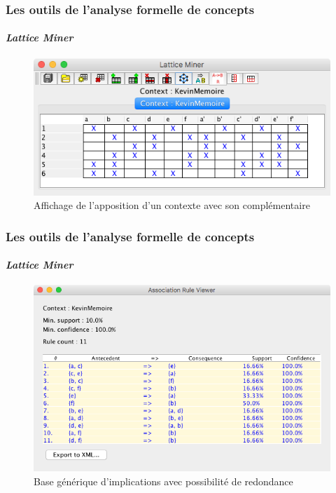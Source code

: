 \documentclass[french]{beamer}
\newcommand{\lm}{\emph{Lattice Miner}\xspace}
\begin{document}
\begin{frame}
\frametitle{Les outils de l'analyse formelle de concepts}
\framesubtitle{\lm}
\begin{figure}[H]
\caption{Affichage de l'apposition d'un contexte avec son complémentaire}
\label{cap:fig:lm-complem-ctx}
\begin{center}\includegraphics[scale=0.45]{figures/lm-complem-ctx.jpg}\end{center}
\end{figure}
\end{frame}
\begin{frame}
\frametitle{Les outils de l'analyse formelle de concepts}
\framesubtitle{\lm}
\begin{figure}[H]
\caption{Base générique d'implications avec possibilité de redondance}
\label{cap:fig:Imp-Red}
\begin{center}\includegraphics[scale=0.45]{figures/ImplRed.png}\end{center}
\end{figure}
\end{frame}
\end{document}
